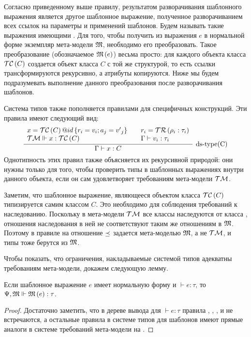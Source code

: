 \newcommand{\ct}[1]{\MM{M}\left(#1\right)}
Согласно приведенному выше правилу, результатом разворачивания шаблонного выражения является другое шаблонное выражение, полученное разворачиванием всех ссылок на параметры и применений шаблонов. Будем называть такие выражения имеющими . Для того, чтобы получить из выражения $e$ в нормальной форме экземпляр мета-модели $\mathfrak{M}$, необходимо его преобразовать. Такое преобразование (обозначаемое $\ct{e}$) весьма просто: для каждого объекта класса $\mathcal{TC}\left(C\right)$ создается объект класса $C$ с той же структурой, то есть ссылки трансформируются рекурсивно, а атрибуты копируются. Ниже мы будем подразумевать выполнение данного преобразования после разворачивания шаблонов.

Система типов также пополняется правилами для специфичных конструкций. Эти правила имеют следующий вид:
$$
\myinfer[\mbox{ds-type(C)}]{
	\Gamma \vdash x : C
}{
	\begin{array}{l}
	x = \obj{\TC{C}}{id}{r_i = v_i; a_j = {v'}_j}\\
	\TM \Vdash x : \TC{C} 
	\end{array}	
	&
	\begin{array}{l}
	r_i = \TR{\rho_i : \tau_i}\\
	\Gamma \vdash v_i : \tau_i\\
	\end{array}	
}
$$ 
Однотипность этих правил также объясняется их рекурсивной природой: они нужны только для того, чтобы проверить типы в шаблонных выражениях внутри данного объекта, если он сам удовлетворяет требованиям мета-модели $\mathcal{TM}$.

Заметим, что шаблонное выражение, являющееся объектом класса $\mathcal{TC}\left(C\right)$ типизируется самим классом $C$. Это необходимо для соблюдения требований к наследованию. Поскольку в мета-модели $\mathcal{TM}$ все классы наследуются от класса , отношения наследования в ней не соответствуют таким же отношениям в $\mathfrak{M}$. Поэтому в правиле  на  отношение $\preceq$ задается мета-моделью $\mathfrak{M}$, а не $\mathcal{TM}$, и типы тоже берутся из $\mathfrak{M}$. 

Чтобы показать, что ограничения, накладываемые системой типов адекватны требованиям мета-модели, докажем следующую лемму.
\begin{Lemm}\label{LemmNF}
Если шаблонное выражение $e$ имеет нормальную форму и $\vdash e : \tau$, то $\fromMM \ct{e} : \tau$.
\end{Lemm}
\begin{proof}
Достаточно заметить, что в дереве вывода для $\vdash e : \tau$ правила , , ,  и  не встречаются, а остальные правила в системе типов для шаблонов имеют прямые аналоги в системе требований мета-модели на .
\end{proof}


